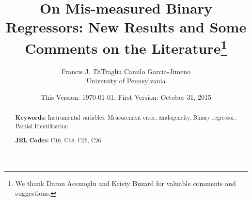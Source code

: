\documentclass[12pt]{article}
\title{On Mis-measured Binary Regressors: New Results and Some Comments on the Literature\footnote{We thank Daron Acemoglu and Kristy Buzard for valuable comments and suggestions.}}
\author{Francis J.\ DiTraglia  \hspace{2em} Camilo Garcia-Jimeno\\
\normalsize University of Pennsylvania}
\date{\small This Version: \today, First Version: October 31, 2015}
\begin{document}
\maketitle


\begin{abstract}
  \singlespacing
	

  	\bigskip
	\noindent\textbf{Keywords:} Instrumental variables, Measurement error, Endogeneity, Binary regressor, Partial Identification

	\medskip
  \noindent\textbf{JEL Codes:} C10, C18, C25, C26
\end{abstract}







%





%
\end{document}

